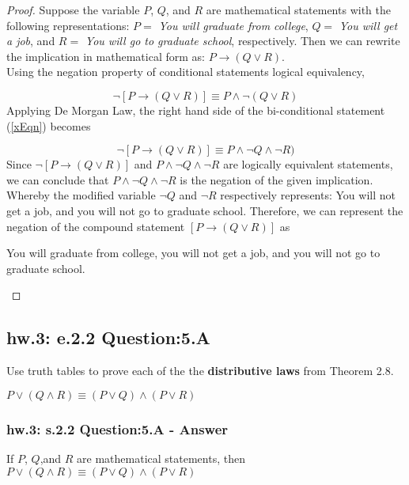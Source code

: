 \begin{proof}
Suppose the variable $P$, $Q$, and $R$ are mathematical statements with the following representations: $P =$ {\it You will graduate from college}, $Q =$ {\it You will get a job}, and $R =$ {\it You will go to graduate school}, respectively. Then we can rewrite the implication in mathematical form as: $P \to (Q \vee R)$. \\
Using the negation property of conditional statements logical equivalency, 

\begin{equation}
\label{xEqn}
\neg [P \to (Q \vee R)] \equiv P \wedge \neg (Q \vee R)
\end{equation}
Applying De Morgan Law, the right hand side of the bi-conditional statement (\ref{xEqn}) becomes

\begin{equation}
\label{yEqn}
\neg [P \to (Q \vee R)] \equiv P \wedge \neg Q \wedge \neg R)
\end{equation}
Since $\neg [P \to (Q \vee R)]$ and $P \wedge \neg Q \wedge \neg R$ are logically equivalent statements, we can conclude that $P \wedge \neg Q \wedge \neg R$ is the negation of the given implication. Whereby the modified variable $\neg Q$ and $\neg R$ respectively represents: You will not get a job, and you will not go to graduate school. Therefore, we can represent the negation of the compound statement $[P \to (Q \vee R)]$ as 

\begin{center}
You will graduate from college, you will not get a job, and you will not go to graduate school.
\end{center}

\end{proof}

\newpage
\subsection{hw.3: e.2.2 Question:5.A}
Use truth tables to prove each of the the {\bf distributive laws} from Theorem 2.8. \\
\begin{center}
$P \vee (Q \wedge R) \equiv (P \vee Q) \wedge (P \vee R)$
\end{center}

\subsubsection*{hw.3: s.2.2 Question:5.A - Answer}
\begin{tcolorbox}
\begin{theorem}
If $P$, $Q$,and $R$ are mathematical statements, then $P \vee (Q \wedge R) \equiv (P \vee Q) \wedge (P \vee R)$
\end{theorem}
\end{tcolorbox}

